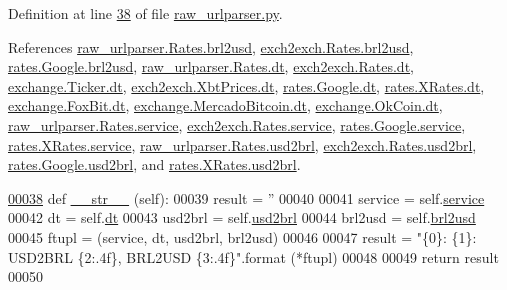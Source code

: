 Definition at line \hyperlink{raw__urlparser_8py_source_l00038}{38} of file \hyperlink{raw__urlparser_8py_source}{raw\+\_\+urlparser.\+py}.



References \hyperlink{raw__urlparser_8py_source_l00026}{raw\+\_\+urlparser.\+Rates.\+brl2usd}, \hyperlink{exch2exch_8py_source_l00030}{exch2exch.\+Rates.\+brl2usd}, \hyperlink{rates_8py_source_l00093}{rates.\+Google.\+brl2usd}, \hyperlink{raw__urlparser_8py_source_l00024}{raw\+\_\+urlparser.\+Rates.\+dt}, \hyperlink{exch2exch_8py_source_l00028}{exch2exch.\+Rates.\+dt}, \hyperlink{exchange_8py_source_l00047}{exchange.\+Ticker.\+dt}, \hyperlink{exch2exch_8py_source_l00057}{exch2exch.\+Xbt\+Prices.\+dt}, \hyperlink{rates_8py_source_l00090}{rates.\+Google.\+dt}, \hyperlink{rates_8py_source_l00146}{rates.\+X\+Rates.\+dt}, \hyperlink{exchange_8py_source_l00234}{exchange.\+Fox\+Bit.\+dt}, \hyperlink{exchange_8py_source_l00304}{exchange.\+Mercado\+Bitcoin.\+dt}, \hyperlink{exchange_8py_source_l00369}{exchange.\+Ok\+Coin.\+dt}, \hyperlink{raw__urlparser_8py_source_l00027}{raw\+\_\+urlparser.\+Rates.\+service}, \hyperlink{exch2exch_8py_source_l00031}{exch2exch.\+Rates.\+service}, \hyperlink{rates_8py_source_l00095}{rates.\+Google.\+service}, \hyperlink{rates_8py_source_l00150}{rates.\+X\+Rates.\+service}, \hyperlink{raw__urlparser_8py_source_l00025}{raw\+\_\+urlparser.\+Rates.\+usd2brl}, \hyperlink{exch2exch_8py_source_l00029}{exch2exch.\+Rates.\+usd2brl}, \hyperlink{rates_8py_source_l00092}{rates.\+Google.\+usd2brl}, and \hyperlink{rates_8py_source_l00148}{rates.\+X\+Rates.\+usd2brl}.


\begin{DoxyCode}
\hypertarget{classraw__urlparser_1_1_rates.tex_l00038}{}\hyperlink{classraw__urlparser_1_1_rates_a3e8a9922ba7e95bd54945c87d07e5f0e}{00038}     \textcolor{keyword}{def }\hyperlink{classraw__urlparser_1_1_rates_a3e8a9922ba7e95bd54945c87d07e5f0e}{\_\_str\_\_} (self):
00039         result = \textcolor{stringliteral}{''}
00040 
00041         service = self.\hyperlink{classraw__urlparser_1_1_rates_acb05316e95a39bc42590a882712f854b}{service}
00042         dt      = self.\hyperlink{classraw__urlparser_1_1_rates_a09b3c7cb595f3135c3eda648b1bb4c3f}{dt}
00043         usd2brl = self.\hyperlink{classraw__urlparser_1_1_rates_a52d9b688be8385a87783b27839749b4a}{usd2brl}
00044         brl2usd = self.\hyperlink{classraw__urlparser_1_1_rates_adc9df007bec75344f9f89cb631d1aeb3}{brl2usd}
00045         ftupl = (service, dt, usd2brl, brl2usd)
00046         
00047         result = \textcolor{stringliteral}{"\{0\}: \{1\}: USD2BRL \{2:.4f\}, BRL2USD \{3:.4f\}"}.format (*ftupl)
00048 
00049         \textcolor{keywordflow}{return} result        
00050         
\end{DoxyCode}
